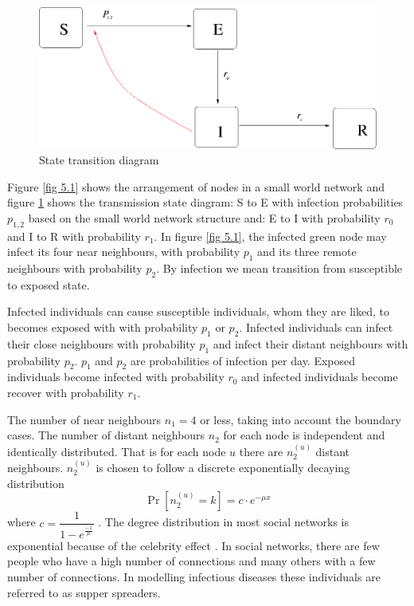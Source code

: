  \begin{figure}[h]
 \centering
 \includegraphics[scale=0.3]{images/swseir.png}
 \caption{State transition diagram} \label{fig 5.2}
\end{figure}
 
 
Figure \ref{fig 5.1} shows the arrangement of nodes in a small world network and figure \ref{fig 5.2} shows the transmission state diagram: S to E  with infection probabilities $p_ {1,2} $ based on the small world network structure and: E to I with probability $r_0$ and I to R with probability $r_1$. In figure \ref{fig 5.1}, the infected green node may infect its four near neighbours, with probability $p_1$ and its three remote neighbours with probability $p_2$. By infection we mean transition from susceptible to exposed state. 

Infected individuals can cause susceptible individuals, whom they are liked, to becomes exposed with with probability $p_1$ or $p_2$. Infected individuals can  infect their close neighbours with  probability $p_1$ and infect their distant neighbours with probability $p_2$. $p_1 $ and $p_2$ are probabilities of infection per day. Exposed individuals become infected with probability $r_0$ and infected individuals become recover with probability $r_1$.

The number of near neighbours $n_1 = 4$ or less, taking into account the boundary cases.
The number of distant neighbours $n_2$  for each node is independent and  identically distributed. That is for each node $u$ there are $n_2^ {(u)} $ distant neighbours. $n_2^ {(u)} $ is chosen to follow a discrete exponentially decaying distribution 
\begin{equation} 
 \Pr[n_2^{(u)} = k] = c \cdot e^{-\mu x  } \label{5.2.1}
 \end{equation}
where $c = \dfrac{1}{1- e^{\frac{-1}{\mu}}}$ \citep{fu2013propagation}. The degree distribution in most social networks is exponential because of the celebrity effect \citep{estrada2015first}. In social networks, there are few people who have a high number of connections and many others with a few number of connections. In modelling infectious diseases these individuals are referred to as supper spreaders.


